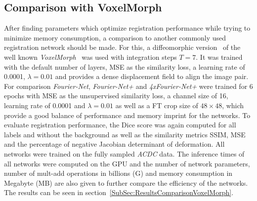 \documentclass[english,version-2022-01]{uzl-thesis} %
\begin{document}
\subsection{Comparison with VoxelMorph} \label{SubSec:ComparisonVoxelMorph}
After finding parameters which optimize registration performance while trying to minimize memory consumption, a comparison to another commonly used registration network should be made. For this, a diffeomorphic version~\cite{VoxelMorphDiff} of the well known \emph{VoxelMorph}~\cite{Voxelmorph} was used with integration steps $T=7$. It was trained with the default number of layers, MSE as the similarity loss, a learning rate of 0.0001, $\lambda=0.01$ and provides a dense displacement field to align the image pair. For comparison \emph{Fourier-Net}, \emph{Fourier-Net+} and \emph{4xFourier-Net+} were trained for 6 epochs with MSE as the unsupervised similarity loss, a channel size of 16, learning rate of 0.0001 and $\lambda=0.01$ as well as a FT crop size of $48 \times 48$, which provide a good balance of performance and memory imprint for the networks. To evaluate registration performance, the Dice score was again computed for all labels and without the background as well as the similarity metrics SSIM, MSE and the percentage of negative Jacobian determinant of deformation. All networks were trained on the fully sampled \emph{ACDC} data. The inference times of all networks were computed on the GPU and the number of network parameters, number of mult-add operations in billions (G) and memory consumption in Megabyte (MB) are also given to further compare the efficiency of the networks. The results can be seen in section~\ref{SubSec:ResultsComparisonVoxelMorph}.
\end{document}

